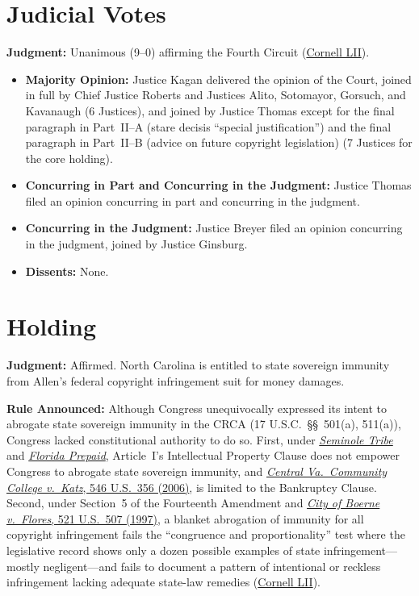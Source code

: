 \documentclass[12pt]{article}
\begin{document}
\section{Judicial Votes}
\textbf{Judgment:} Unanimous (9--0) affirming the Fourth Circuit (\href{https://www.law.cornell.edu/supremecourt/text/18-877}{Cornell LII}).
\begin{itemize}
  \item \textbf{Majority Opinion:} Justice Kagan delivered the opinion of the Court, joined in full by Chief Justice Roberts and Justices Alito, Sotomayor, Gorsuch, and Kavanaugh (6 Justices), and joined by Justice Thomas except for the final paragraph in Part~II--A (stare decisis ``special justification'') and the final paragraph in Part~II--B (advice on future copyright legislation) (7 Justices for the core holding).
  \item \textbf{Concurring in Part and Concurring in the Judgment:} Justice Thomas filed an opinion concurring in part and concurring in the judgment.
  \item \textbf{Concurring in the Judgment:} Justice Breyer filed an opinion concurring in the judgment, joined by Justice Ginsburg.
  \item \textbf{Dissents:} None.
\end{itemize}

\section{Holding}
\textbf{Judgment:} Affirmed. North Carolina is entitled to state sovereign immunity from Allen's federal copyright infringement suit for money damages.

\textbf{Rule Announced:} Although Congress unequivocally expressed its intent to abrogate state sovereign immunity in the CRCA (17 U.S.C.\ \S\S~501(a), 511(a)), Congress lacked constitutional authority to do so. First, under \href{https://supreme.justia.com/cases/federal/us/517/44/}{\textit{Seminole Tribe}} and \href{https://supreme.justia.com/cases/federal/us/527/627/}{\textit{Florida Prepaid}}, Article~I's Intellectual Property Clause does not empower Congress to abrogate state sovereign immunity, and \href{https://supreme.justia.com/cases/federal/us/546/356/}{\textit{Central Va.\ Community College v.\ Katz}, 546 U.S.\ 356 (2006)}, is limited to the Bankruptcy Clause. Second, under Section~5 of the Fourteenth Amendment and \href{https://supreme.justia.com/cases/federal/us/521/507/}{\textit{City of Boerne v.\ Flores}, 521 U.S.\ 507 (1997)}, a blanket abrogation of immunity for all copyright infringement fails the ``congruence and proportionality'' test where the legislative record shows only a dozen possible examples of state infringement---mostly negligent---and fails to document a pattern of intentional or reckless infringement lacking adequate state-law remedies (\href{https://www.law.cornell.edu/supremecourt/text/18-877}{Cornell LII}).
\end{document}
